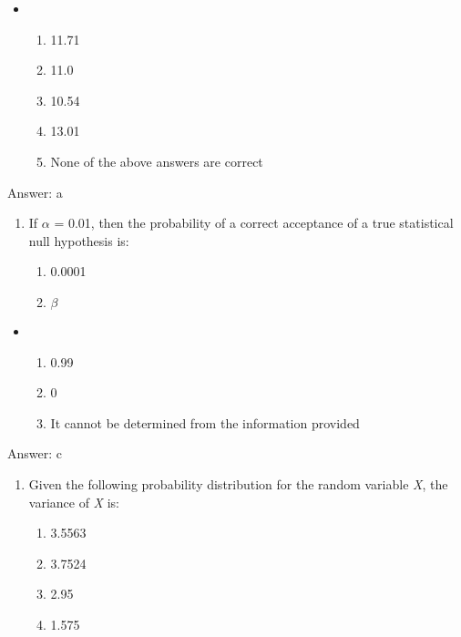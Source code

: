 \documentclass[]{article}
\providecommand{\tightlist}{%
  \setlength{\itemsep}{0pt}\setlength{\parskip}{0pt}}
\begin{document}
\begin{itemize}
\item
  \begin{enumerate}
  \def\labelenumi{\alph{enumi}.}
  \item
    11.71
  \item
    11.0
  \item
    10.54
  \item
    13.01
  \item
    None of the above answers are correct
  \end{enumerate}
\end{itemize}

Answer: a

\begin{enumerate}
\def\labelenumi{\arabic{enumi}.}
\setcounter{enumi}{5}
\item
  If \(\alpha\) = 0.01, then the probability of a correct acceptance of
  a true statistical null hypothesis is:

  \begin{enumerate}
  \def\labelenumii{\alph{enumii}.}
  \tightlist
  \item
    0.0001
  \item
    \(\beta\)
  \end{enumerate}
\end{enumerate}

\begin{itemize}
\item
  \begin{enumerate}
  \def\labelenumi{\alph{enumi}.}
  \setcounter{enumi}{2}
  \tightlist
  \item
    0.99
  \item
    0
  \item
    It cannot be determined from the information provided
  \end{enumerate}
\end{itemize}

Answer: c

\begin{enumerate}
\def\labelenumi{\arabic{enumi}.}
\setcounter{enumi}{6}
\item
  Given the following probability distribution for the random variable
  \emph{X}, the variance of \emph{X} is:

  \begin{enumerate}
  \def\labelenumii{\alph{enumii}.}
  \tightlist
  \item
    3.5563
  \item
    3.7524
  \item
    2.95
  \item
    1.575
  \end{enumerate}
\end{enumerate}
\end{document}
